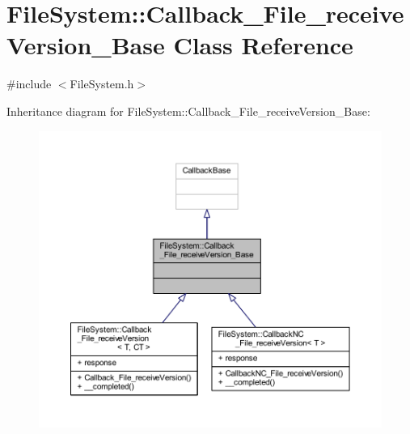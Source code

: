 \hypertarget{class_file_system_1_1_callback___file__receive_version___base}{}\section{File\+System\+:\+:Callback\+\_\+\+File\+\_\+receive\+Version\+\_\+\+Base Class Reference}
\label{class_file_system_1_1_callback___file__receive_version___base}


{\ttfamily \#include $<$File\+System.\+h$>$}



Inheritance diagram for File\+System\+:\+:Callback\+\_\+\+File\+\_\+receive\+Version\+\_\+\+Base\+:
\nopagebreak
\begin{figure}[H]
\begin{center}
\leavevmode
\includegraphics[width=350pt]{class_file_system_1_1_callback___file__receive_version___base__inherit__graph}
\end{center}
\end{figure}


